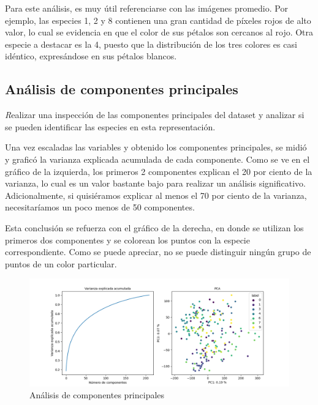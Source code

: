 \documentclass{article}
\begin{document}
Para este análisis, es muy útil referenciarse con las imágenes promedio.
Por ejemplo, las especies 1, 2 y 8 contienen una gran cantidad de píxeles
rojos de alto valor, lo cual se evidencia en que el color de sus pétalos son cercanos al rojo. Otra especie a destacar es la 4, puesto que la distribución de los tres colores es casi idéntico, expresándose en sus pétalos blancos.

\subsection{Análisis de componentes principales}

{\emph Realizar una inspección de las componentes principales del dataset y analizar si se
pueden identiﬁcar las especies en esta representación.}

Una vez escaladas las variables y obtenido los componentes principales, se midió y graficó la varianza explicada acumulada de cada componente. Como se ve en el gráfico de la
izquierda, los primeros 2 componentes explican el 20 por ciento de la varianza,
lo cual es un valor bastante bajo para realizar un análisis significativo.
Adicionalmente,  si quisiéramos explicar al menos el 70 por ciento de la varianza,
necesitaríamos un poco menos de 50 componentes.

Esta conclusión se refuerza con el gráfico de la derecha, en donde se utilizan los primeros dos componentes y se colorean los puntos con la especie correspondiente.
Como se puede apreciar, no se puede distinguir ningún grupo de puntos de un color particular.

\begin{figure}[h!]
  \centering    
  \includegraphics[width=.9\textwidth]{9_1_pca.png}
  \caption{Análisis de componentes principales}
\end{figure}

\end{document}
